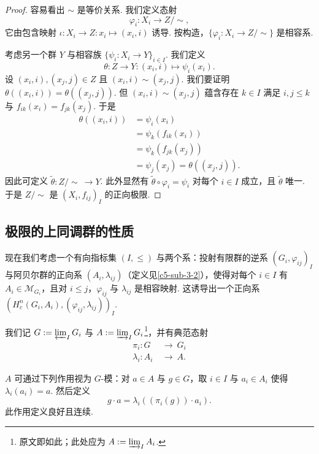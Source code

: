\begin{proof}
容易看出 $\sim$ 是等价关系. 我们定义态射
\[
\varphi_i:X_i\to Z/\!\sim,
\]
它由包含映射 $\iota:X_i\to Z:x_i\mapsto(x_i,i)$ 诱导. 按构造，$\{\varphi_i:X_i\to Z/\!\sim\}$ 是相容系.

考虑另一个群 $Y$ 与相容族 $\{\psi_i:X_i\to Y\}_{i\in I}$. 我们定义
\[
\theta:Z\to Y:(x_i,i)\mapsto\psi_i(x_i).
\]
设 $(x_i,i),(x_j,j)\in Z$ 且 $(x_i,i)\sim(x_j,j)$. 我们要证明 $\theta((x_i,i))=\theta((x_j,j))$. 但 $(x_i,i)\sim(x_j,j)$ 蕴含存在 $k\in I$ 满足 $i,j\leq k$ 与 $f_{ik}(x_i)=f_{jk}(x_j)$. 于是
\[
\begin{aligned}
\theta((x_i,i))&=\psi_i(x_i)\\
&=\psi_k(f_{ik}(x_i))\\
&=\psi_k(f_{jk}(x_j))\\
&=\psi_j(x_j)=\theta((x_j,j)).
\end{aligned}
\]
因此可定义 $\widetilde{\theta}:Z/\!\sim\ \to Y$. 此外显然有 $\widetilde{\theta}\circ\varphi_i=\psi_i$ 对每个 $i\in I$ 成立，且 $\widetilde{\theta}$ 唯一. 于是 $Z/\!\sim$ 是 $(X_i,f_{ij})_I$ 的正向极限.
\end{proof}

\subsection{极限的上同调群的性质}
\label{c5-sub-3-3}

现在我们考虑一个有向指标集 $(I,\leq)$ 与两个系：投射有限群的逆系 $(G_i,\varphi_{ij})_I$ 与阿贝尔群的正向系 $(A_i,\lambda_{ij})$（定义见\autoref{c5-sub-3-2}），使得对每个 $i\in I$ 有 $A_i\in\mathscr{M}_{G_i}$，且对 $i\leq j$，$\varphi_{ij}$ 与 $\lambda_{ij}$ 是相容映射. 这诱导出一个正向系 $(H^n_c(G_i,A_i),(\varphi_{ij},\lambda_{ij}))_I$.

我们记 $G:=\varprojlim_I G_i$ 与 $A:=\varinjlim_I G_i$\footnote{原文即如此；此处应为 $A:=\varinjlim_I A_i$.}，并有典范态射
\[
\begin{aligned}
\pi_i:G\ &\to\ G_i\\
\lambda_i:A_i\ &\to\ A.
\end{aligned}
\]

\begin{lemma}\label{c5-lem-3-5}
$A$ 可通过下列作用视为 $G$-模：对 $a\in A$ 与 $g\in G$，取 $i\in I$ 与 $a_i\in A_i$ 使得 $\lambda_i(a_i)=a$. 然后定义
\[
g\cdot a=\lambda_i((\pi_i(g))\cdot a_i).
\]
此作用定义良好且连续.
\end{lemma}

